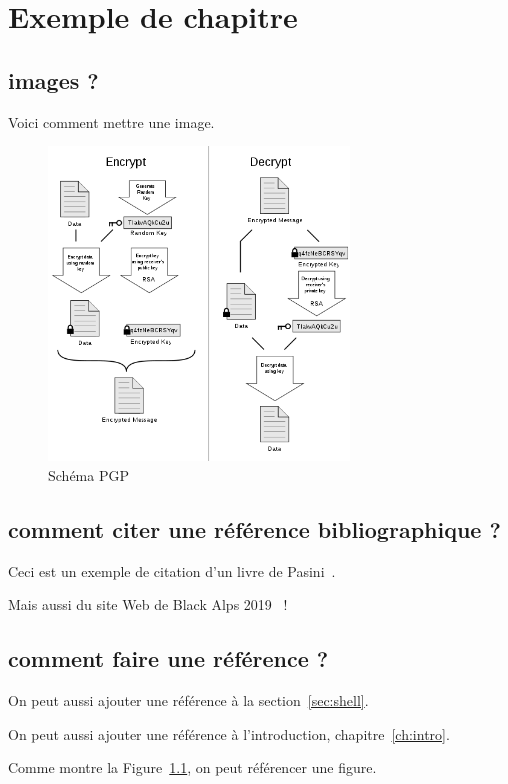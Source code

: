 \chapter{Exemple de chapitre}


\section{images ?}

Voici comment mettre une image.

\begin{figure}
	\centering
	\includegraphics[width=8cm]{images/PGP_101.png}
	\caption{Schéma PGP}
	\label{fig:pgp}
\end{figure}


\section{comment citer une référence bibliographique ?}

Ceci est un exemple de citation d'un livre de Pasini~\cite{pasini2015}.

Mais aussi du site Web de Black Alps 2019~\cite{BA19} !


\section{comment faire une référence ?}

On peut aussi ajouter une référence à la section~\ref{sec:shell}.

On peut aussi ajouter une référence à l'introduction, chapitre~\ref{ch:intro}.

Comme montre la Figure~\ref{fig:pgp}, on peut référencer une figure.


